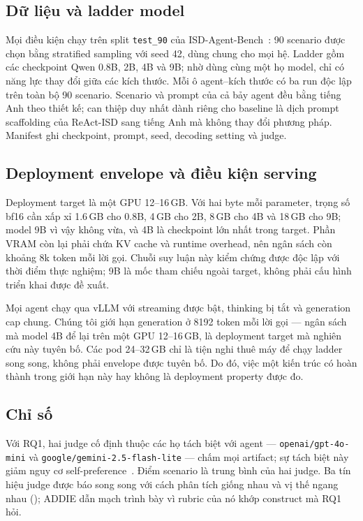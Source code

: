 \subsection{Dữ liệu và ladder model}
\label{sec:dataset}
\label{sec:setup}

Mọi điều kiện chạy trên split \texttt{test\_90} của
ISD-Agent-Bench~\cite{isdagentbench}: 90 scenario được chọn bằng stratified
sampling với seed 42, dùng chung cho mọi hệ. Ladder gồm các checkpoint Qwen
0.8B, 2B, 4B và 9B; nhờ dùng cùng một họ model, chỉ có năng lực thay đổi giữa các
kích thước. Mỗi ô agent--kích thước có ba run độc lập trên toàn bộ 90 scenario.
Scenario và prompt của cả bảy agent đều bằng tiếng Anh theo thiết kế; can thiệp
duy nhất dành riêng cho baseline là dịch prompt scaffolding của ReAct-ISD sang
tiếng Anh mà không thay đổi phương pháp. Manifest ghi checkpoint, prompt, seed,
decoding setting và judge.

\subsection{Deployment envelope và điều kiện serving}
\label{sec:assumptions}

Deployment target là một GPU 12--16\,GB. Với hai byte mỗi parameter, trọng số
bf16 cần xấp xỉ 1.6\,GB cho 0.8B, 4\,GB cho 2B, 8\,GB cho 4B và 18\,GB cho 9B;
model 9B vì vậy không vừa, và 4B là checkpoint lớn nhất trong target. Phần VRAM
còn lại phải chứa KV cache và runtime overhead, nên ngân sách còn khoảng 8k token
mỗi lời gọi. Chuỗi suy luận này kiểm chứng được độc lập với thời điểm thực
nghiệm; 9B là mốc tham chiếu ngoài target, không phải cấu hình triển khai được đề
xuất.

Mọi agent chạy qua vLLM với streaming được bật, thinking bị tắt và generation cap
chung. Chúng tôi giới hạn generation ở 8192 token mỗi lời gọi --- ngân sách mà model 4B để lại trên một GPU 12--16\,GB, là deployment target mà nghiên cứu này tuyên bố. Các pod 24--32\,GB chỉ là tiện nghi thuê máy để chạy ladder song song, không phải envelope được tuyên bố.
Do đó, việc một kiến trúc có hoàn thành trong giới hạn này hay không là deployment
property được đo.

\subsection{Chỉ số}
\label{sec:metrics}

Với RQ1, hai judge cố định thuộc các họ tách biệt với agent ---
\texttt{openai/gpt-4o-mini} và \texttt{google/gemini-2.5-flash-lite} --- chấm mọi
artifact; sự tách biệt này giảm nguy cơ
self-preference~\cite{panickssery2024llm}. Điểm scenario là trung bình của hai
judge. Ba tín hiệu judge được báo song song với cách phân tích giống nhau và vị
thế ngang nhau (); ADDIE dẫn mạch trình bày vì rubric của
nó khớp construct mà RQ1 hỏi.

